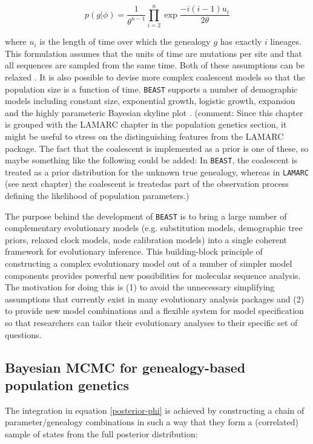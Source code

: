 \documentclass[cup7b, english]{cupbook}
\begin{document}
 \begin{equation}
p(g|\phi) = \frac{1}{\theta^{n-1}}\prod_{i=2}^n \exp\frac{-i(i-1)u_i}{2\theta}
\end{equation}

where $u_i$ is the length of time over which the genealogy $g$ has exactly $i$ lineages.
This formulation assumes that the units of time are mutations per site and that all
sequences are sampled from the same time. Both of these assumptions can be relaxed \cite{DNRS2002}.
It is also possible to devise more complex coalescent models so that the population size
is a function of time. \texttt{BEAST} supports a number of demographic models including
constant size, exponential growth, logistic growth, expansion and the highly parameteric
Bayesian skyline plot \cite{DRSP2005}. (comment: Since this chapter is grouped with the LAMARC chapter in the population genetics section, it might be useful to stress on the distinguishing features from the LAMARC package. The fact that the coalescent is implemented as a prior is one of these, so maybe something like the following could be added: In \texttt{BEAST}, the coalescent is treated as a prior distribution for the unknown true genealogy, whereas in \texttt{LAMARC} (see next chapter) the coalescent is treatedas part of the observation process defining the likelihood of population parameters.)

The purpose behind the development of \texttt{BEAST} is to bring a large number
of complementary evolutionary models (e.g. substitution models, demographic tree priors,
 relaxed clock models, node calibration models) into a single coherent
framework for evolutionary inference. This building-block principle of constructing a complex
evolutionary model out of a number of simpler model components provides
powerful new possibilities for molecular sequence analysis. The motivation
for doing this is (1) to avoid the unnecessary simplifying assumptions
that currently exist in many evolutionary analysis packages and (2)
to provide new model combinations and a flexible system for model
specification so that researchers can tailor their evolutionary analyses
to their specific set of questions.

\subsection{Bayesian MCMC for genealogy-based population genetics}

The integration in equation \ref{posterior-phi} is achieved by constructing a chain of
parameter/genealogy combinations in such a way that they form a (correlated) sample
of states from the full posterior distribution:
\end{document}
